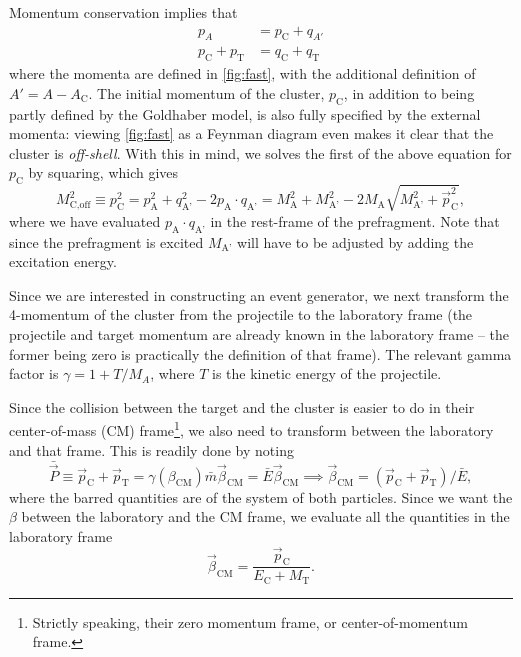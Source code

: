 Momentum conservation implies that
\begin{align}
p_{A} &= p_\text{C} + q_{A'} \\
p_\text{C} + p_\text{T} &= q_\text{C} + q_\text{T}
\end{align}
where the momenta are defined in \autoref{fig:fast}, with the additional definition of $A'=A-A_\text{C}$.
The initial momentum of the cluster, $p_\text{C}$, in addition to being partly defined by the Goldhaber model, is also fully specified by the external momenta: viewing \autoref{fig:fast} as a Feynman diagram even makes it clear that the cluster is \emph{off-shell}.
With this in mind, we solves the first of the above equation for $p_\text{C}$ by squaring, which gives
\begin{equation}
M_\text{C,off}^2 \equiv p_\text{C}^2 = p_\text{A}^2 +  q_\text{A'}^2 -  2p_\text{A}\cdot q_\text{A'} =M_\text{A}^2 + M_\text{A'}^2 - 2M_\text{A}\sqrt{M_\text{A'}^2 + \vec{p}_\text{C}^2},\label{eq:offmass}
\end{equation}
where we have evaluated $p_\text{A}\cdot q_\text{A'}$ in the rest-frame of the prefragment. Note that since the prefragment is excited $M_\text{A'}$ will have to be adjusted by adding the excitation energy.

Since we are interested in constructing an event generator, we next transform the 4-momentum of the cluster from the projectile to the laboratory frame (the projectile and target momentum are already known in the laboratory frame -- the former being zero is practically the definition of that frame). The relevant gamma factor is
$\gamma = 1 + T/M_A$, where $T$ is the kinetic energy of the projectile.

Since the collision between the target and the cluster is easier to do in their center-of-mass (CM) frame\footnote{Strictly speaking, their zero momentum frame, or center-of-momentum frame.}, we also need to transform between the laboratory and that frame. This is readily done by noting
\begin{equation}
\bar{\vec{P}} \equiv \vec{p}_\text{C} + \vec{p}_\text{T} = \gamma(\beta_\text{CM}) \bar{m} \vec{\beta}_\text{CM} = \bar{E}\vec{\beta}_\text{CM} \implies \vec{\beta}_\text{CM} = (\vec{p}_\text{C} + \vec{p}_\text{T})/\bar{E},
\end{equation}
where the barred quantities are of the system of both particles. Since we want the $\beta$ between the laboratory and the CM frame, we evaluate all the quantities in the laboratory frame
\begin{equation}
\vec{\beta}_\text{CM} = \frac{\vec{p}_\text{C}}{E_\text{C} + M_\text{T}}. \label{eq:betazm}
\end{equation}

